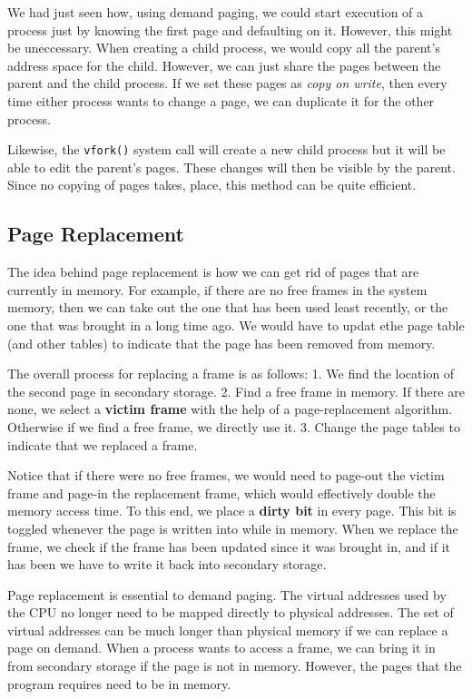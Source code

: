 We had just seen how, using demand paging, we could start execution of a
process just by knowing the first page and defaulting on it. However,
this might be uneccessary. When creating a child process, we would copy
all the parent's address space for the child. However, we can just share
the pages between the parent and the child process. If we set these
pages as \emph{copy on write}, then every time either process wants to
change a page, we can duplicate it for the other process.

Likewise, the \texttt{vfork()} system call will create a new child
process but it will be able to edit the parent's pages. These changes
will then be visible by the parent. Since no copying of pages takes,
place, this method can be quite efficient.

\hypertarget{page-replacement}{%
\subsection{Page Replacement}\label{page-replacement}}

The idea behind page replacement is how we can get rid of pages that are
currently in memory. For example, if there are no free frames in the
system memory, then we can take out the one that has been used least
recently, or the one that was brought in a long time ago. We would have
to updat ethe page table (and other tables) to indicate that the page
has been removed from memory.

The overall process for replacing a frame is as follows: 1. We find the
location of the second page in secondary storage. 2. Find a free frame
in memory. If there are none, we select a \textbf{victim frame} with the
help of a page-replacement algorithm. Otherwise if we find a free frame,
we directly use it. 3. Change the page tables to indicate that we
replaced a frame.

Notice that if there were no free frames, we would need to page-out the
victim frame and page-in the replacement frame, which would effectively
double the memory access time. To this end, we place a \textbf{dirty
bit} in every page. This bit is toggled whenever the page is written
into while in memory. When we replace the frame, we check if the frame
has been updated since it was brought in, and if it has been we have to
write it back into secondary storage.

Page replacement is essential to demand paging. The virtual addresses
used by the CPU no longer need to be mapped directly to physical
addresses. The set of virtual addresses can be much longer than physical
memory if we can replace a page on demand. When a process wants to
access a frame, we can bring it in from secondary storage if the page is
not in memory. However, the pages that the program requires need to be
in memory.

